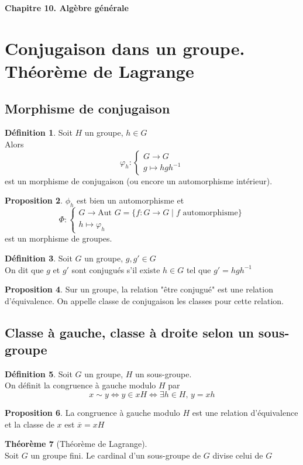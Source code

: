 \documentclass[10pt,a4paper]{article}
\theoremstyle{definition}
\newtheorem{proposition}{Proposition}[section]
\newtheorem{theorem}[proposition]{Théorème}
\newtheorem{definition}[proposition]{Définition}
\begin{document}
\renewcommand{\labelitemi}{$*$}
\begin{center}
{\Large \textbf{Chapitre 10. Algèbre générale}}
\end{center}

\section{Conjugaison dans un groupe. Théorème de Lagrange}
\subsection{Morphisme de conjugaison}
\begin{definition}
Soit $H$ un groupe, $h \in G$ \\
Alors
\[ \varphi_h: \begin{cases}
G \to G \\
g \mapsto h g h^{-1}
\end{cases} \] est un morphisme de conjugaison (ou encore un automorphisme intérieur).
\end{definition}
\begin{proposition}
$\phi_h$ est bien un automorphisme et
\[ \Phi: \begin{cases}
G \to \text{Aut } G = \{ f: G \to G \mid f \text{ automorphisme} \} \\
h \mapsto \varphi_h
\end{cases}\]
est un morphisme de groupes.
\end{proposition}
\begin{definition}
Soit $G$ un groupe, $g, g' \in G$ \\
On dit que $g$ et $g'$ sont conjugués s'il existe $h \in G$ tel que $g' = h g h^{-1}$
\end{definition}
\begin{proposition}
Sur un groupe, la relation "être conjugué" est une relation d'équivalence. On appelle classe de conjugaison les classes pour cette relation.
\end{proposition}

\subsection{Classe à gauche, classe à droite selon un sous-groupe}
\begin{definition}
Soit $G$ un groupe, $H$ un sous-groupe. \\
On définit la congruence à gauche modulo $H$ par
\[ x \sim y \iff y \in x H \iff \exists h \in H ,\, y = x h \]
\end{definition}
\begin{proposition}
La congruence à gauche modulo $H$ est une relation d'équivalence et la classe de $x$ est $\overline{x} = x H$
\end{proposition}
\begin{theorem}[Théorème de Lagrange]
\hfill \\
Soit $G$ un groupe fini. Le cardinal d'un sous-groupe de $G$ divise celui de $G$
\end{theorem}
\end{document}
